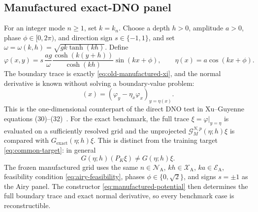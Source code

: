\documentclass[11pt]{article}
\newcommand{\G}{\mathcal G}
\begin{document}
\subsection{Manufactured exact-DNO panel}
\label{sec:manufactured}

For an integer mode $n\geq1$, set $k=k_n$.  Choose a depth $h>0$, amplitude
$a>0$, phase $\phi\in[0,2\pi)$, and direction sign $s\in\{-1,1\}$, and set
$\omega=\omega(k,h)=\sqrt{gk\tanh(kh)}$.  Define
\begin{equation}
  \varphi(x,y)
  =s\,\frac{ag}{\omega}
    \frac{\cosh(k(y+h))}{\cosh(kh)}\sin(kx+\phi),\qquad
  \eta(x)=a\cos(kx+\phi).
  \label{eq:manufactured-potential}
\end{equation}
The boundary trace is exactly \eqref{eq:old-manufactured-xi}, and the normal
derivative is known without solving a boundary-value problem:
\begin{equation}
  [G_{\mathrm{exact}}(\eta;h)\xi](x)
  =\left(\varphi_y-\eta_x\varphi_x\right)_{y=\eta(x)}.
  \label{eq:manufactured-exact-dno}
\end{equation}
This is the one-dimensional counterpart of the direct DNO test in
Xu--Guyenne equations (30)--(32)~\cite{xu2009}.  For the exact benchmark, the
full trace $\xi=\varphi|_{y=\eta}$ is evaluated on a sufficiently resolved
grid and the unprojected $\G^{N,p}_M(\eta;h)\xi$ is compared with
$G_{\mathrm{exact}}(\eta;h)\xi$.  This is distinct from the training target
\eqref{eq:common-target}: in general
\begin{equation}
  G(\eta;h)(P_K\xi)\neq G(\eta;h)\xi.
\end{equation}
The frozen manufactured grid uses the same
$n\in\mathcal N_{\mathrm A}$, $kh\in\mathcal X_{\mathrm A}$,
$ka\in\mathcal E_{\mathrm A}$, feasibility condition
\eqref{eq:airy-feasibility}, phases $\phi\in\{0,\sqrt2\}$, and signs
$s=\pm1$ as the Airy panel.  The constructor
\eqref{eq:manufactured-potential} then determines the full boundary trace and
exact normal derivative, so every benchmark case is reconstructible.
\end{document}
